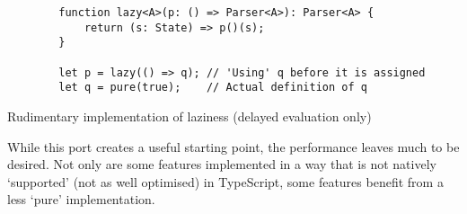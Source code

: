 \begin{capminted}
    \begin{verbatim}
        function lazy<A>(p: () => Parser<A>): Parser<A> {
            return (s: State) => p()(s);
        }

        let p = lazy(() => q); // 'Using' q before it is assigned
        let q = pure(true);    // Actual definition of q
    \end{verbatim}
    \vspace{-0.5\baselineskip}
    \caption{Rudimentary implementation of laziness (delayed evaluation only)}
    \label{lst:old_lazy}
\end{capminted}

While this port creates a useful starting point, the performance leaves much to be desired.
Not only are some features implemented in a way that is not natively `supported' (not as well optimised) in TypeScript, some features benefit from a less `pure' implementation.
